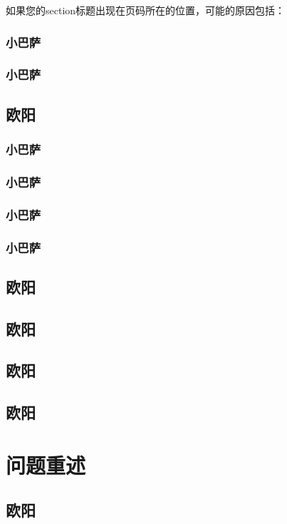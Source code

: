 \documentclass[a4paper]{ctexart}
\begin{document}
如果您的section标题出现在页码所在的位置，可能的原因包括：

\subsubsection{小巴萨}
\subsubsection{小巴萨}


\subsection{欧阳}

\subsubsection{小巴萨}
\subsubsection{小巴萨}
\subsubsection{小巴萨}
\subsubsection{小巴萨}

\subsection{欧阳}
\subsection{欧阳}
\subsection{欧阳}
\subsection{欧阳}


\section{问题重述}

\subsection{欧阳}
\end{document}
